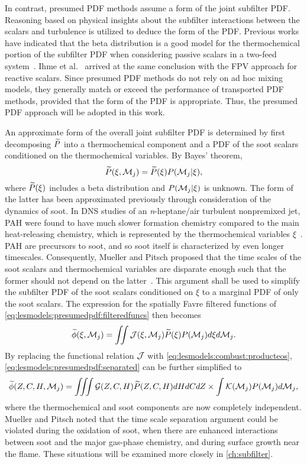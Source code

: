 In contrast, presumed PDF methods assume a form of the joint subfilter PDF. Reasoning based on physical insights about the subfilter interactions between the scalars and turbulence is utilized to deduce the form of the PDF. Previous works have indicated that the beta distribution is a good model for the thermochemical portion of the subfilter PDF when considering passive scalars in a two-feed system~\cite{cook1994,jimenez1997,wall2000}. Ihme et al.~\cite{ihme2005} arrived at the same conclusion with the FPV approach for reactive scalars. Since presumed PDF methods do not rely on ad hoc mixing models, they generally match or exceed the performance of transported PDF methods, provided that the form of the PDF is appropriate. Thus, the presumed PDF approach will be adopted in this work.

An approximate form of the overall joint subfilter PDF is determined by first decomposing $\widetilde{P}$ into a thermochemical component and a PDF of the soot scalars conditioned on the thermochemical variables. By Bayes' theorem,
\begin{equation}\label{eq:lesmodels:presumedpdf:bayes}
  \widetilde{P}(\xi,\mathcal{M}_j) = \widetilde{P}(\xi)P(\mathcal{M}_j|\xi),
\end{equation}
where $\widetilde{P}(\xi)$ includes a beta distribution and $P(\mathcal{M}_j|\xi)$ is unknown. The form of the latter has been approximated previously through consideration of the dynamics of soot. In DNS studies of an \textit{n}-heptane/air turbulent nonpremixed jet, PAH were found to have much slower formation chemistry compared to the main heat-releasing chemistry, which is represented by the thermochemical variables $\xi$~\cite{attili2014,bisetti2012}. PAH are precursors to soot, and so soot itself is characterized by even longer timescales. Consequently, Mueller and Pitsch proposed that the time scales of the soot scalars and thermochemical variables are disparate enough such that the former should not depend on the latter~\cite{subfilterpdf2011}. This argument shall be used to simplify the subfilter PDF of the soot scalars conditioned on $\xi$ to a marginal PDF of only the soot scalars. The expression for the spatially Favre filtered functions of \cref{eq:lesmodels:presumedpdf:filteredfuncs} then becomes
\begin{equation}\label{eq:lesmodels:presumedpdf:separated}
  \widetilde{\phi}(\xi,\mathcal{M}_j) = \iint \mathcal{J}(\xi,\mathcal{M}_j)\widetilde{P}(\xi)P(\mathcal{M}_j) d\xi d\mathcal{M}_j.
\end{equation}
By replacing the functional relation $\mathcal{J}$ with \cref{eq:lesmodels:combust:producteos}, \cref{eq:lesmodels:presumedpdf:separated} can be further simplified to
\begin{equation}\label{eq:lesmodels:presumedpdf:indep}
  \widetilde{\phi}(Z,C,H,\mathcal{M}_j) = \iiint \mathcal{G}(Z,C,H)\widetilde{P}(Z,C,H) dHdCdZ \times \int \mathcal{K}(\mathcal{M}_j)P(\mathcal{M}_j) d\mathcal{M}_j,
\end{equation}
where the thermochemical and soot components are now completely independent. Mueller and Pitsch noted that the time scale separation argument could be violated during the oxidation of soot, when there are enhanced interactions between soot and the major gas-phase chemistry, and during surface growth near the flame. These situations will be examined more closely in \cref{ch:subfilter}.


